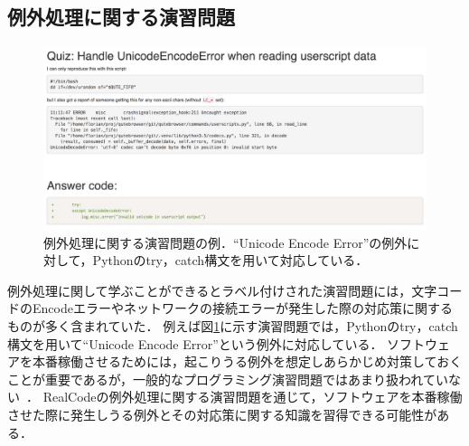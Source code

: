 \subsection{例外処理に関する演習問題}


\begin{figure}[t]
  \centering
  \includegraphics[width=1.0\columnwidth]{20190107-lab-study-exception-exercise2.png}
  \caption{例外処理に関する演習問題の例．``Unicode Encode Error''の例外に対して，Pythonのtry，catch構文を用いて対応している．}
  \label{fig:lab-study-eg-exception}
\end{figure}


例外処理に関して学ぶことができるとラベル付けされた演習問題には，文字コードのEncodeエラーやネットワークの接続エラーが発生した際の対応策に関するものが多く含まれていた．
例えば図\ref{fig:lab-study-eg-exception}に示す演習問題では，Pythonのtry，catch構文を用いて``Unicode Encode Error''という例外に対応している．
ソフトウェアを本番稼働させるためには，起こりうる例外を想定しあらかじめ対策しておくことが重要であるが，一般的なプログラミング演習問題ではあまり扱われていない~\cite{Piteira_Learning_Computer_Programming}．
RealCodeの例外処理に関する演習問題を通じて，ソフトウェアを本番稼働させた際に発生しうる例外とその対応策に関する知識を習得できる可能性がある．


